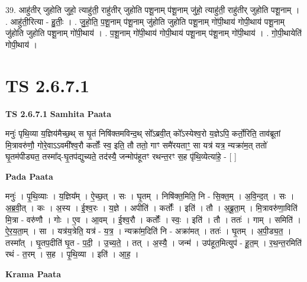 \documentclass[17pt]{extarticle}
\begin{document}
39. आहु॑तीर् जुहोति जुहो॒ त्याहु॑ती॒ राहु॑तीर् जुहोति पशू॒नाम् प॑शू॒नाम् जु॑हो॒ त्याहु॑ती॒ राहु॑तीर् जुहोति पशू॒नाम् । . आहु॑ती॒रित्या - हु॒तीः॒ । . जु॒हो॒ति॒ प॒शू॒नाम् प॑शू॒नाम् जु॑होति जुहोति पशू॒नाम् गो॑पी॒थाय॑ गोपी॒थाय॑ पशू॒नाम् जु॑होति जुहोति पशू॒नाम् गो॑पी॒थाय॑ । . प॒शू॒नाम् गो॑पी॒थाय॑ गोपी॒थाय॑ पशू॒नाम् प॑शू॒नाम् गो॑पी॒थाय॑ । . गो॒पी॒थायेति॑ गोपी॒थाय॑ । \newline
\pagebreak
{}

\section{ TS 2.6.7.1 }

\textbf{TS 2.6.7.1 } \newline
\textbf{Samhita Paata} \newline

मनुः॑ पृथि॒व्या य॒ज्ञिय॑मैच्छ॒थ् स घृ॒तं निषि॑क्तमविन्द॒थ् सो᳚ऽब्रवी॒त् को᳚ऽस्येश्व॒रो य॒ज्ञेऽपि॒ कर्तो॒रिति॒ ताव॑ब्रूतां मि॒त्रावरु॑णौ॒ गोरे॒वाऽऽवमी᳚श्व॒रौ कर्तोः᳚ स्व॒ इति॒ तौ ततो॒ गाꣳ समै॑रयताꣳ॒॒ सा यत्र॑ यत्र॒ न्यक्रा॑म॒त् ततो॑ घृ॒तम॑पीड्यत॒ तस्मा᳚द्-घृ॒तप॑द्युच्यते॒ तद॑स्यै॒ जन्मोप॑हूतꣳ रथन्त॒रꣳ स॒ह पृ॑थि॒व्येत्या॑हे॒ - [  ] \newline

\textbf{Pada Paata} \newline

मनुः॑ । पृ॒थि॒व्याः । य॒ज्ञिय᳚म् । ऐ॒च्छ॒त् । सः । घृ॒तम् । निषि॑क्त॒मिति॒ नि - सि॒क्त॒म् । अ॒वि॒न्द॒त् । सः । अ॒ब्र॒वी॒त् । कः । अ॒स्य । ई॒श्व॒रः । य॒ज्ञे । अपीति॑ । कर्तोः᳚ । इति॑ । तौ । अ॒ब्रू॒ता॒म् । मि॒त्रावरु॑णा॒विति॑ मि॒त्रा - वरु॑णौ । गोः । ए॒व । आ॒वम् । ई॒श्व॒रौ । कर्तोः᳚ । स्वः॒ । इति॑ । तौ । ततः॑ । गाम् । समिति॑ । ऐ॒र॒य॒ता॒म् । सा । यत्र॑य॒त्रेति॒ यत्र॑ - य॒त्र॒ । न्यक्रा॑म॒दिति॑ नि - अक्रा॑मत् । ततः॑ । घृ॒तम् । अ॒पी॒ड्य॒त॒ । तस्मा᳚त् । घृ॒तप॒दीति॑ घृ॒त - प॒दी॒ । उ॒च्य॒ते॒ । तत् । अ॒स्यै॒ । जन्म॑ । उप॑हूत॒मित्युप॑ - हू॒त॒म् । र॒थ॒न्त॒रमिति॑ रथं - त॒रम् । स॒ह । पृ॒थि॒व्या । इति॑ । आ॒ह॒ ।  \newline


\textbf{Krama Paata} \newline
\end{document}

